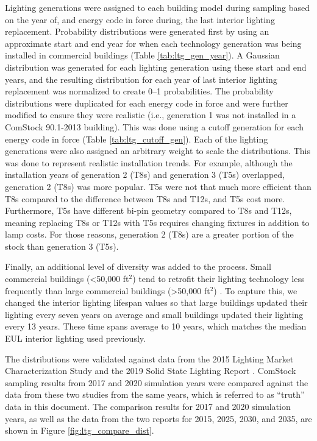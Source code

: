 Lighting generations were assigned to each building model during sampling based on the year of, and energy code in force during, the last interior lighting replacement.  Probability distributions were generated first by using an approximate start and end year for when each technology generation was being installed in commercial buildings (Table \ref{tab:ltg_gen_year}). A Gaussian distribution was generated for each lighting generation using these start and end years, and the resulting distribution for each year of last interior lighting replacement was normalized to create 0--1 probabilities. The probability distributions were duplicated for each energy code in force and were further modified to ensure they were realistic (i.e., generation 1 was not installed in a ComStock 90.1-2013 building). This was done using a cutoff generation for each energy code in force (Table \ref{tab:ltg_cutoff_gen}). Each of the lighting generations were also assigned an arbitrary weight to scale the distributions. This was done to represent realistic installation trends. For example, although the installation years of generation 2 (T8s) and generation 3 (T5s) overlapped, generation 2 (T8s) was more popular. T5s were not that much more efficient than T8s compared to the difference between T8s and T12s, and T5s cost more. Furthermore, T5s have different bi-pin geometry compared to T8s and T12s, meaning replacing T8s or T12s with T5s requires changing fixtures in addition to lamp costs. For those reasons, generation 2 (T8s) are a greater portion of the stock than generation 3 (T5s).

%



Finally, an additional level of diversity was added to the process.  Small commercial buildings (<50,000 ft$^2$) tend to retrofit their lighting technology less frequently than large commercial buildings (>50,000 ft$^2$) \citep{neea2019cbsa}.  To capture this, we changed the interior lighting lifespan values so that large buildings updated their lighting every seven years on average and small buildings updated their lighting every 13 years. These time spans average to 10 years, which matches the median EUL interior lighting used previously.

The distributions were validated against data from the 2015 Lighting Market Characterization Study \citep{doe2015lmc} and the 2019 Solid State Lighting Report \citep{doe2019ssl}. ComStock sampling results from 2017 and 2020 simulation years were compared against the data from these two studies from the same years, which is referred to as ``truth'' data in this document. The comparison results for 2017 and 2020 simulation years, as well as the data from the two reports for 2015, 2025, 2030, and 2035, are shown in Figure \ref{fig:ltg_compare_dist}.

